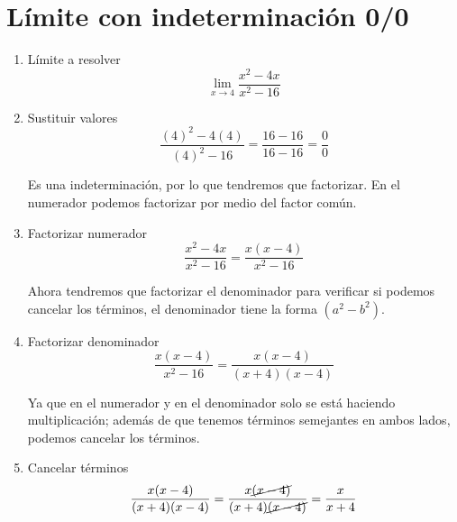 \documentclass[a4paper,10pt]{article}
\begin{document}
\section{Límite con indeterminación 0/0}
\begin{enumerate}
	\item Límite a resolver
	      $$\lim_{x\to4}\frac{x^{2} - 4x}{x^{2} - 16}$$

	\item Sustituir valores
	      $$\frac{(4)^{2} - 4(4)}{(4)^{2} - 16} = \frac{16 - 16}{16 - 16} = \frac{0}{0}$$

	      Es una indeterminación, por lo que tendremos que factorizar. En el numerador podemos factorizar por medio del factor común.

	\item Factorizar numerador
	      $$\frac{x^{2} - 4x}{x^{2} - 16} = \frac{x(x - 4)}{x^{2} - 16}$$

	      Ahora tendremos que factorizar el denominador para verificar si podemos cancelar los términos, el denominador tiene la forma $(a^{2} - b^{2})$.

	\item Factorizar denominador
	      $$\frac{x(x - 4)}{x^{2} - 16} = \frac{x(x - 4)}{(x + 4)(x - 4)}$$

	      Ya que en el numerador y en el denominador solo se está haciendo multiplicación; además de que tenemos términos semejantes en ambos lados, podemos cancelar los términos.

	\item Cancelar términos
	      $$\frac{x(x - 4)}{(x + 4)(x - 4)} = \frac{x\cancel{(x - 4)}}{(x + 4)\cancel{(x - 4)}} = \frac{x}{x + 4}$$
\end{enumerate}
\end{document}
